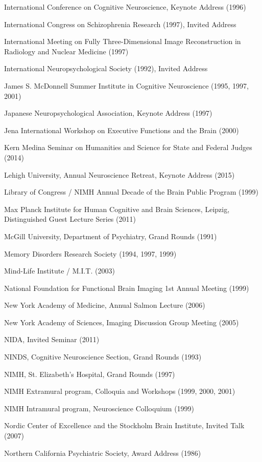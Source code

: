 \documentclass[10 pt]{article}
\begin{document}
International Conference on Cognitive Neuroscience, Keynote Address (1996)

International Congress on Schizophrenia Research (1997), Invited Address

International Meeting on Fully Three-Dimensional Image Reconstruction in Radiology and Nuclear Medicine (1997)

International Neuropsychological Society (1992), Invited Address

James S. McDonnell Summer Institute in Cognitive Neuroscience (1995, 1997, 2001)

Japanese Neuropsychological Association, Keynote Address (1997)

Jena International Workshop on Executive Functions and the Brain (2000)

Kern Medina Seminar on Humanities and Science for State and Federal Judges (2014)

Lehigh University, Annual Neuroscience Retreat, Keynote Address (2015)

Library of Congress / NIMH Annual Decade of the Brain Public Program (1999)

Max Planck Institute for Human Cognitive and Brain Sciences, Leipzig, Distinguished Guest Lecture Series (2011)

McGill University, Department of Psychiatry, Grand Rounds (1991)

Memory Disorders Research Society (1994, 1997, 1999)

Mind-Life Institute / M.I.T. (2003)

National Foundation for Functional Brain Imaging 1st Annual Meeting (1999)

New York Academy of Medicine, Annual Salmon Lecture (2006)

New York Academy of Sciences, Imaging Discussion Group Meeting (2005)

NIDA, Invited Seminar (2011)

NINDS, Cognitive Neuroscience Section, Grand Rounds (1993)

NIMH, St. Elizabeth's Hospital, Grand Rounds (1997)

NIMH Extramural program, Colloquia and Workshops (1999, 2000, 2001)

NIMH Intramural program, Neuroscience Colloquium (1999)

Nordic Center of Excellence and the Stockholm Brain Institute, Invited Talk (2007)

Northern California Psychiatric Society, Award Address (1986)
\end{document}
